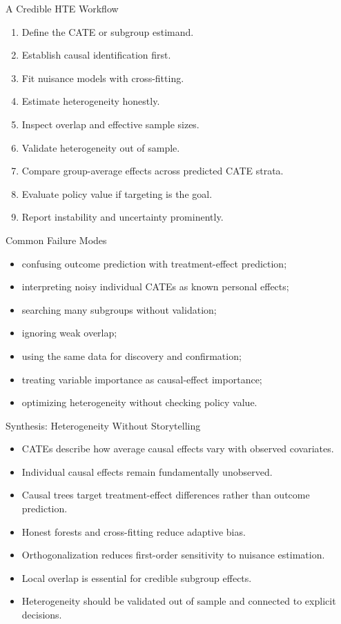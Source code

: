 \documentclass[aspectratio=169,11pt]{beamer}
\begin{document}
\begin{frame}{A Credible HTE Workflow}
\begin{enumerate}
\item Define the CATE or subgroup estimand.
\item Establish causal identification first.
\item Fit nuisance models with cross-fitting.
\item Estimate heterogeneity honestly.
\item Inspect overlap and effective sample sizes.
\item Validate heterogeneity out of sample.
\item Compare group-average effects across predicted CATE strata.
\item Evaluate policy value if targeting is the goal.
\item Report instability and uncertainty prominently.
\end{enumerate}
\end{frame}

\begin{frame}{Common Failure Modes}
\begin{itemize}
\item confusing outcome prediction with treatment-effect prediction;
\item interpreting noisy individual CATEs as known personal effects;
\item searching many subgroups without validation;
\item ignoring weak overlap;
\item using the same data for discovery and confirmation;
\item treating variable importance as causal-effect importance;
\item optimizing heterogeneity without checking policy value.
\end{itemize}
\end{frame}

\begin{frame}{Synthesis: Heterogeneity Without Storytelling}
\begin{itemize}
\item CATEs describe how average causal effects vary with observed covariates.
\item Individual causal effects remain fundamentally unobserved.
\item Causal trees target treatment-effect differences rather than outcome prediction.
\item Honest forests and cross-fitting reduce adaptive bias.
\item Orthogonalization reduces first-order sensitivity to nuisance estimation.
\item Local overlap is essential for credible subgroup effects.
\item Heterogeneity should be validated out of sample and connected to explicit decisions.
\end{itemize}
\end{frame}
\end{document}
